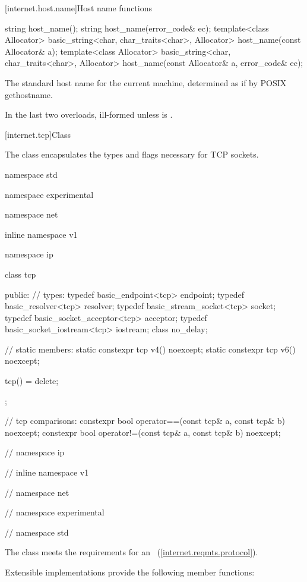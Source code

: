 [internet.host.name]{Host name functions}

%
\begin{itemdecl}
string host_name();
string host_name(error_code& ec);
template<class Allocator>
  basic_string<char, char_traits<char>, Allocator>
    host_name(const Allocator& a);
template<class Allocator>
  basic_string<char, char_traits<char>, Allocator>
    host_name(const Allocator& a, error_code& ec);
\end{itemdecl}

\begin{itemdescr}
\pnum
\returns The standard host name for the current machine, determined as if by POSIX gethostname.

\pnum
\remarks In the last two overloads, ill-formed unless  is .
\end{itemdescr}



%
[internet.tcp]{Class }

\pnum
The class  encapsulates the types and flags necessary for TCP sockets.

\begin{codeblock}
namespace std {
namespace experimental {
namespace net {
inline namespace v1 {
namespace ip {

  class tcp
  {
  public:
    // types:
    typedef basic_endpoint<tcp> endpoint;
    typedef basic_resolver<tcp> resolver;
    typedef basic_stream_socket<tcp> socket;
    typedef basic_socket_acceptor<tcp> acceptor;
    typedef basic_socket_iostream<tcp> iostream;
    class no_delay;

    // static members:
    static constexpr tcp v4() noexcept;
    static constexpr tcp v6() noexcept;

    tcp() = delete;
  };

  // tcp comparisons:
  constexpr bool operator==(const tcp& a, const tcp& b) noexcept;
  constexpr bool operator!=(const tcp& a, const tcp& b) noexcept;

} // namespace ip
} // inline namespace v1
} // namespace net
} // namespace experimental
} // namespace std
\end{codeblock}

\pnum
The  class meets the requirements for an ~(\ref{internet.reqmts.protocol}).

%
\pnum
 Extensible implementations provide the following member functions:

